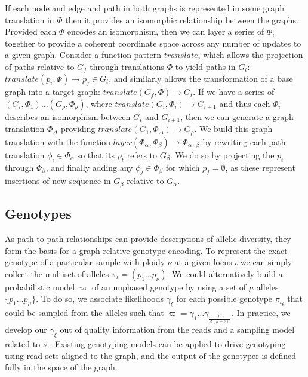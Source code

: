 If each node and edge and path in both graphs is represented in some graph translation in $\Phi$ then it provides an isomorphic relationship between the graphs.
Provided each $\Phi$ encodes an isomorphism, then we can layer a series of $\Phi_i$ together to provide a coherent coordinate space across any number of updates to a given graph.
Consider a function pattern $translate$, which allows the projection of paths relative to $G_f$ through translations $\Phi$ to yield paths in $G_t$: $translate(p_i, \Phi) \to p_j \in G_t$, and similarly allows the transformation of a base graph into a target graph: $translate(G_f, \Phi) \to G_t$.
If we have a series of $(G_i, \Phi_1) \ldots (G_\rho, \Phi_\rho)$, where $translate(G_i, \Phi_i) \to G_{i+1}$ and thus each $\Phi_i$ describes an isomorphism between $G_i$ and $G_{i+1}$, then we can generate a graph translation $\Phi_\Delta$ providing $translate(G_1, \Phi_\Delta) \to G_\rho$.
We build this graph translation with the function $layer(\Phi_\alpha, \Phi_\beta) \to \Phi_{\alpha \circ \beta}$ by rewriting each path translation $\phi_i \in \Phi_\alpha$ so that its $p_t$ refers to $G_\beta$.
We do so by projecting the $p_t$ through $\Phi_\beta$, and finally adding any $\phi_j \in \Phi_\beta$ for which $p_f = \emptyset$, as these represent insertions of new sequence in $G_\beta$ relative to $G_\alpha$.

\subsection{Genotypes}
\label{sec:genotypes}

As path to path relationships can provide descriptions of allelic diversity, they form the basis for a graph-relative genotype encoding.
To represent the exact genotype of a particular sample with ploidy $\nu$ at a given locus $\iota$ we can simply collect the multiset of alleles $\pi_\iota = ( p_1 \ldots p_\nu)$.
We could alternatively build a probabilistic model $\varpi$ of an unphased genotype by using a set of $\mu$ alleles $\{ p_1 \ldots p_\mu\}$.
To do so, we associate likelihoods $\gamma_\xi$ for each possible genotype $\pi_{\iota_\xi}$ that could be sampled from the alleles such that $\varpi = \gamma_1 \ldots \gamma_{\frac{\mu!}{\nu!(\mu-\nu)!} }$.
In practice, we develop our $\gamma_\xi$ out of quality information from the reads and a sampling model related to $\nu$ \cite{garrison2012haplotype,li2011statistical}.
Existing genotyping models can be applied to drive genotyping using read sets aligned to the graph, and the output of the genotyper is defined fully in the space of the graph.

